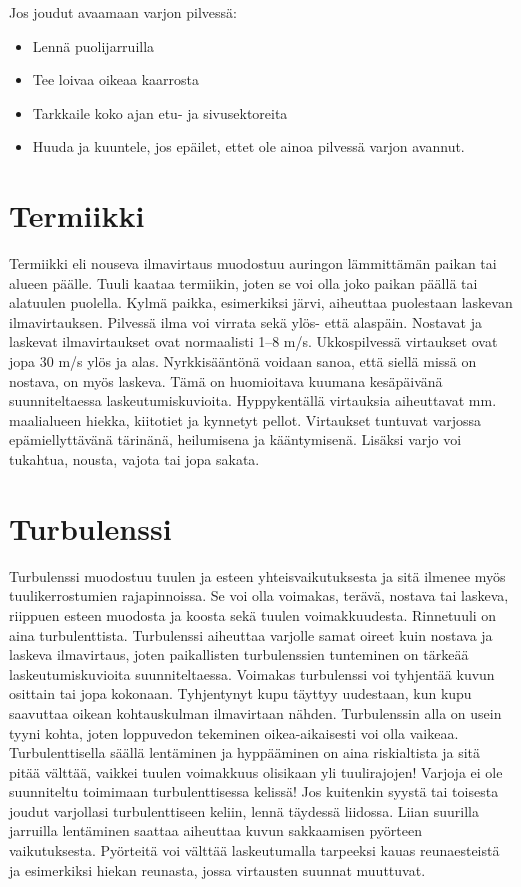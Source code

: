 Jos joudut avaamaan varjon pilvessä: 

\begin{itemize}
\item  Lennä puolijarruilla 
\item  Tee loivaa oikeaa kaarrosta 
\item  Tarkkaile koko ajan etu- ja sivusektoreita 
\item  Huuda ja kuuntele, jos epäilet, ettet ole ainoa pilvessä varjon avannut. 
\end{itemize}
\section{Termiikki}
\label{saaoppi-termiikki}


Termiikki eli nouseva ilmavirtaus muodostuu auringon lämmittämän paikan tai alueen päälle. Tuuli kaataa termiikin, joten se voi olla joko paikan päällä tai alatuulen puolella. Kylmä paikka, esimerkiksi järvi, aiheuttaa puolestaan laskevan ilmavirtauksen. Pilvessä ilma voi virrata sekä ylös- että alaspäin. Nostavat ja laskevat ilmavirtaukset ovat normaalisti 1–8 m/s. Ukkospilvessä virtaukset ovat jopa 30 m/s ylös ja alas. Nyrkkisääntönä voidaan sanoa, että siellä missä on nostava, on myös laskeva. Tämä on huomioitava kuumana kesäpäivänä suunniteltaessa laskeutumiskuvioita. Hyppykentällä virtauksia aiheuttavat mm. maalialueen hiekka, kiitotiet ja kynnetyt pellot. Virtaukset tuntuvat varjossa epämiellyttävänä tärinänä, heilumisena ja kääntymisenä. Lisäksi varjo voi tukahtua, nousta, vajota tai jopa sakata. 

\section{Turbulenssi}
\label{saaoppi-turbulenssi}


Turbulenssi muodostuu tuulen ja esteen yhteisvaikutuksesta ja sitä ilmenee myös tuulikerrostumien rajapinnoissa. Se voi olla voimakas, terävä, nostava tai laskeva, riippuen esteen muodosta ja koosta sekä tuulen voimakkuudesta. Rinnetuuli on aina turbulenttista. Turbulenssi aiheuttaa varjolle samat oireet kuin nostava ja laskeva ilmavirtaus, joten paikallisten turbulenssien tunteminen on tärkeää laskeutumiskuvioita suunniteltaessa. Voimakas turbulenssi voi tyhjentää kuvun osittain tai jopa kokonaan. Tyhjentynyt kupu täyttyy uudestaan, kun kupu saavuttaa oikean kohtauskulman ilmavirtaan nähden. Turbulenssin alla on usein tyyni kohta, joten loppuvedon tekeminen oikea-aikaisesti voi olla vaikeaa. Turbulenttisella säällä lentäminen ja hyppääminen on aina riskialtista ja sitä pitää välttää, vaikkei tuulen voimakkuus olisikaan yli tuulirajojen! Varjoja ei ole suunniteltu toimimaan turbulenttisessa kelissä! Jos kuitenkin syystä tai toisesta joudut varjollasi turbulenttiseen keliin, lennä täydessä liidossa. Liian suurilla jarruilla lentäminen saattaa aiheuttaa kuvun sakkaamisen pyörteen vaikutuksesta. Pyörteitä voi välttää laskeutumalla tarpeeksi kauas reunaesteistä ja esimerkiksi hiekan reunasta, jossa virtausten suunnat muuttuvat. 

